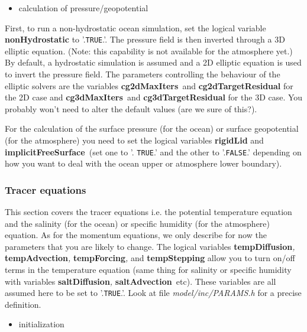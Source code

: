 \begin{itemize} 
\item calculation of pressure/geopotential
\end{itemize} 

First, to run a non-hydrostatic ocean simulation, set the logical variable 
\textbf{nonHydrostatic} to '.\texttt{TRUE}.'. The pressure field is then
inverted through a 3D elliptic equation. (Note: this capability is not
available for the atmosphere yet.) By default, a hydrostatic simulation is
assumed and a 2D elliptic equation is used to invert the pressure field. The
parameters controlling the behaviour of the elliptic solvers are the
variables \textbf{cg2dMaxIters}\textit{\ }and \textbf{cg2dTargetResidual }%
for the 2D case and \textbf{cg3dMaxIters}\textit{\ }and \textbf{%
cg3dTargetResidual }for the 3D case. You probably won't need to alter the
default values (are we sure of this?).

For the calculation of the surface pressure (for the ocean) or surface
geopotential (for the atmosphere) you need to set the logical variables 
\textbf{rigidLid} and \textbf{implicitFreeSurface}\textit{\ }(set one to '.%
\texttt{TRUE}.' and the other to '.\texttt{FALSE}.' depending on how you
want to deal with the ocean upper or atmosphere lower boundary).

\subsubsection{Tracer equations}

This section covers the tracer equations i.e. the potential temperature
equation and the salinity (for the ocean) or specific humidity (for the
atmosphere) equation. As for the momentum equations, we only describe for
now the parameters that you are likely to change. The logical variables 
\textbf{tempDiffusion}\textit{, }\textbf{tempAdvection}\textit{, }\textbf{%
tempForcing}\textit{,} and \textbf{tempStepping} allow you to turn on/off
terms in the temperature equation (same thing for salinity or specific
humidity with variables \textbf{saltDiffusion}\textit{, }\textbf{%
saltAdvection}\textit{\ }etc). These variables are all assumed here to be
set to '.\texttt{TRUE}.'. Look at file \textit{model/inc/PARAMS.h }for a
precise definition.

\begin{itemize}
\item initialization
\end{itemize}

